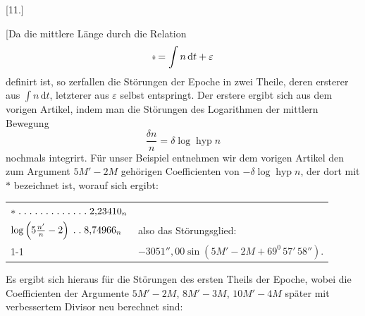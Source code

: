 \clearpage
\begin{landscape}
\begingroup
\fontsize{10}{13}\selectfont
{}
\renewcommand{\headrulewidth}{0pt}
\begin{center}[11.]\end{center}
\begingroup
\newcommand{\VElevenLongitude}{\mathord{\tikz[x=1ex,y=1ex,baseline=0.08ex,line width=.075ex,line cap=round,line join=round]{\draw (.30,1.05) .. controls (.24,.92) and (.02,.76) .. (.04,.62) .. controls (.07,.43) and (.52,.43) .. (.56,.62) .. controls (.58,.76) and (.37,.94) .. (.30,1.05);\draw (.30,.10)--(.30,.67);\draw (.04,.30)--(.56,.30);}}}
\par\noindent\hspace*{\parindent}[Da die mittlere Länge durch die Relation
\[
\VElevenLongitude=\int n\,\mathrm{d}t+\varepsilon
\]
definirt ist, so zerfallen die Störungen der Epoche in zwei Theile, deren ersterer aus \(\int n\,\mathrm{d}t\), letzterer aus \(\varepsilon\) selbst entspringt. Der erstere ergibt sich aus dem vorigen Artikel, indem man die Störungen des Logarithmen der mittlern Bewegung
\[
\frac{\delta n}{n}=\delta\log\operatorname{hyp}n
\]
nochmals integrirt. Für unser Beispiel entnehmen wir dem vorigen Artikel den zum Argument \(5M'-2M\) gehörigen Coefficienten von \(-\delta\log\operatorname{hyp}n\), der dort mit \(*\) bezeichnet ist, worauf sich ergibt:
\endgroup
\begingroup
\newcommand{\VElevenPoint}{\mathord{.}\mkern5mu}
\newcommand{\VElevenFive}{\VElevenPoint\VElevenPoint\VElevenPoint\VElevenPoint\VElevenPoint}
\begin{center}
\begin{tabular}{@{}l@{\quad}l@{}}
\(*\;\VElevenFive\VElevenFive\VElevenPoint\VElevenPoint\VElevenPoint2{,}23410_n\)&\\
\(\log\left(5\frac{n'}{n}-2\right)\;\VElevenPoint\VElevenPoint8{,}74966_n\)&also das Störungsglied:\\
\cline{1-1}
\multicolumn{1}{r}{\(3{,}48444\)}&\(-3051''{,}00\sin(5M'-2M+69^0\,57'\,58'').\)
\end{tabular}
\end{center}
\endgroup
\par\noindent\hspace*{\parindent}Es ergibt sich hieraus für die Störungen des ersten Theils der Epoche, wobei die Coefficienten der Argumente \(5M'-2M\), \(8M'-3M\), \(10M'-4M\) später mit verbessertem Divisor neu berechnet sind:
\begingroup
\renewcommand{\arraystretch}{1.15}

\end{landscape}

